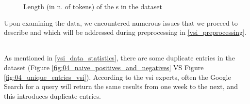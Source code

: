 \begin{figure}[ht]
    \hfill
    
    \caption{
    Length (in n. of tokens) of the \contentType{}s in the \VSI{} dataset
    }
    \label{fig:04_vsi_token_distribution}
\end{figure}







\label{vsi_data_issues}


Upon examining the data, we encountered numerous issues that we proceed to describe and which will be addressed during preprocessing in \headerName{} \ref{vsi_preprocessing}.


\label{vsi_issues_duplicates}
\ \\

As mentioned in \headerName{} \ref{vsi_data_statistics}, there are some duplicate entries in the dataset (Figure \ref{fig:04_naive_positives_and_negatives} VS Figure \ref{fig:04_unique_entries_vsi}). According to the \gls{vsi} experts, often the Google Search for a query will return the same results from one week to the next, and this introduces duplicate entries.
 


